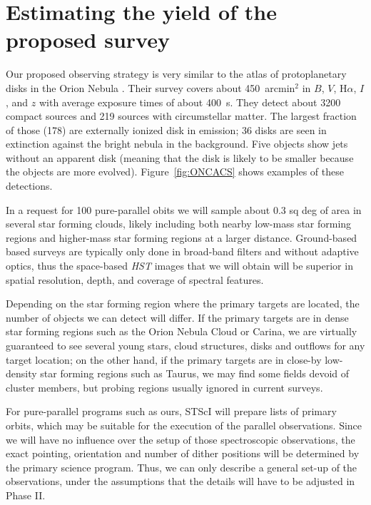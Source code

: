 \documentclass[12pt]{article}
\begin{document}
\section{Estimating the yield of the proposed survey}
Our proposed observing strategy is very similar to the atlas of protoplanetary disks in the Orion Nebula \citep{2008AJ....136.2136R,2013ApJS..207...10R}. Their survey covers about 450~arcmin$^2$ in $B$, $V$, H$\alpha$, $I$, and $z$ with average exposure times of about 400~s. They detect about 3200 compact sources and 219 sources with circumstellar matter. The largest fraction of those (178) are externally ionized disk in emission; 36 disks are seen in extinction against the bright nebula in the background. Five objects show jets without an apparent disk (meaning that the disk is likely to be smaller because the objects are more evolved). Figure~\ref{fig:ONCACS} shows examples of these detections. 

In a request for 100 pure-parallel obits we will sample about 0.3 sq deg of
area in several star forming clouds, likely including both nearby low-mass
star forming regions and higher-mass star forming regions at a larger distance.
 Ground-based based surveys are typically only done in broad-band
filters \citep[IPHAS, which also includes an H$\alpha$ filter is an
  exception][]{2005MNRAS.362..753D} and without adaptive optics, thus the
space-based \emph{HST} images that we will obtain will be superior in spatial
resolution, depth, and coverage of spectral features.


Depending on the star forming region where the primary targets are located, the
number of objects we can detect will differ. If the primary targets are in
dense star forming regions such as the Orion Nebula Cloud or Carina, we are
virtually guaranteed to see several young stars, cloud structures, disks and
outflows for any target location; on the other hand, if the primary targets are
in close-by low-density star forming regions such as Taurus, we may find some
fields devoid of cluster members, but probing regions usually ignored in current surveys. 





%
%
\describeobservations   %
For pure-parallel programs such as ours, STScI will prepare lists of primary orbits, which may be suitable for the execution of the parallel observations. Since we will have no influence over the setup of those spectroscopic observations, the exact pointing, orientation and number of dither positions will be determined by the primary science program. Thus, we can only describe a general set-up of the observations, under the assumptions that the details will have to be adjusted in Phase II.
\end{document}
